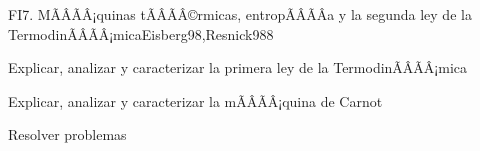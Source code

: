 \begin{sumilla}
\begin{unit}{FI7. MÃÂÃÂ¡quinas tÃÂÃÂ©rmicas, entropÃÂÃÂ­a y la segunda ley de la TermodinÃÂÃÂ¡mica}{Eisberg98,Resnick98}{8}
   \begin{objetivos}
         \item  Explicar, analizar y caracterizar la primera ley de la TermodinÃÂÃÂ¡mica
         \item  Explicar, analizar y caracterizar la mÃÂÃÂ¡quina de Carnot
         \item  Resolver problemas
   \end{objetivos}
\end{unit}


\begin{bibliografia}
\end{bibliografia}

\end{sumilla}

%
